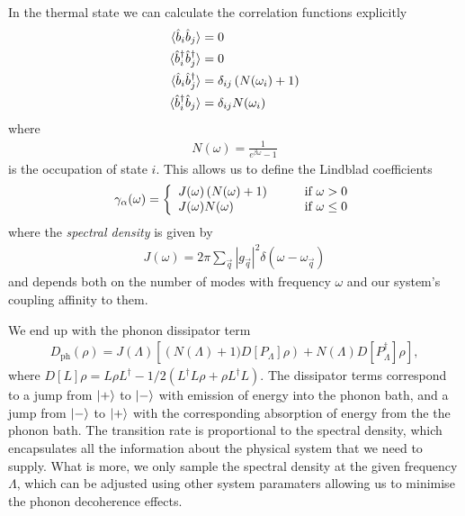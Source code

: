 In the thermal state we can calculate the correlation functions explicitly
\begin{align}
  \langle \hat{b}_i \hat{b}_j \rangle &= 0 \\
  \langle \hat{b}^\dagger_i \hat{b}^\dagger_j \rangle &= 0 \\
  \langle \hat{b}_i \hat{b}^\dagger_j \rangle &= \delta_{ij} \left( N(\omega_i) +1 \right) \\
  \langle \hat{b}^\dagger_i \hat{b}_j \rangle &= \delta_{ij} N(\omega_i)
\end{align}
where
\begin{align}
  N(\omega) = \frac{1}{e^{\beta \omega} - 1}
\end{align}
is the occupation of state $i$. This allows us to define the Lindblad coefficients
\begin{align}
  \gamma_\alpha(\omega) = \left\{
    \begin{array}{l l}
    J(\omega)\left(N(\omega) + 1\right) & \qquad \text{if $\omega > 0$}\\
    J(\omega)N(\omega) & \qquad \text{if $\omega \leq 0$}
  \end{array} \right.
\end{align}
where the \textit{spectral density} is given by
\begin{align}
  J(\omega) = 2\pi \sum_\vec{q} |g_\vec{q}|^2 \delta(\omega-\omega_\vec{q})
\end{align}
and depends both on the number of modes with frequency $\omega$ and our system's coupling affinity to them.

We end up with the phonon dissipator term
\begin{align}
  D_\text{ph}(\rho) = J(\Lambda)\left[\left(N(\Lambda) + 1)D[P_\Lambda]\rho\right) + N(\Lambda)D[P^\dagger_\Lambda]\rho \right],
\end{align}
where $D[L]\rho = L\rho L^\dagger -1/2(L^\dagger L\rho + \rho L^\dagger L)$. The dissipator terms correspond to a jump from $\left\vert+\right\rangle$ to $\left\vert-\right\rangle$ with emission of energy into the phonon bath, and a jump from $\left\vert-\right\rangle$ to $\left\vert+\right\rangle$ with the corresponding absorption of energy from the the phonon bath. The transition rate is proportional to the spectral density, which encapsulates all the information about the physical system that we need to supply. What is more, we only sample the spectral density at the given frequency $\Lambda$, which can be adjusted using other system paramaters allowing us to minimise the phonon decoherence effects.
